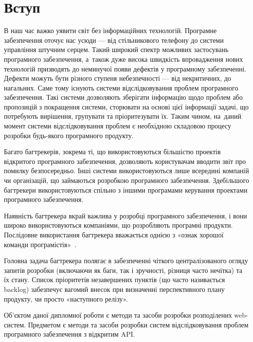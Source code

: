 \documentclass[../main.tex]{subfiles}
\begin{document}
\chapter*{Вступ}

В наш час важко уявити світ без інформаційних технологій. Програмне забезпечення оточує нас усюди — від стільникового телефону до системи управління штучним серцем. Такий широкий спектр можливих застосувань програмного забезпечення, а~також дуже висока швидкість впровадження нових технологій призводять до неминучої появи дефектів у програмному забезпеченні. Дефекти можуть бути різного ступеня небезпечності — від некритичних, до нагальних. Саме тому існують системи відслідковування проблем програмного забезпечення. Такі системи дозволяють зберігати інформацію щодо проблем або пропозицій з покращення системи, сторювати на основі цієї інформації задачі, що потребують вирішення, групувати та пріоритезувати їх. Таким чином, на~даний момент системи відслідковування проблем є необхідною складовою процесу розробки будь-якого програмного продукту.

Багато багтрекерів, зокрема ті, що використовуються більшістю проектів відкритого програмного забезпечення, дозволяють користувачам вводити звіт про помилку безпосередньо. Інші системи використовуються лише всередині компаній чи організацій, що займаються розробкою програмного забезпечення. Здебільшого багтрекери використовуються спільно з іншими програмами керування проектами програмного забезпечення.

Наявність багтрекера вкрай важлива у розробці програмного забезпечення, і вони широко використовуються компаніями, що розробляють програмні продукти. Послідовне використання багтрекера вважається однією з «ознак хорошої команди програмістів»~\cite{painless_bug_tracking}.

Головна задача багтрекера полягає в забезпеченні чіткого централізованого огляду запитів розробки (включаючи як баги, так і зручності, різниця часто нечітка) та їх стану. Список пріоритетів незавершених пунктів (що часто називається backlog) забезпечує вагомий внесок при визначенні перспективного плану продукту, чи просто «наступного релізу».

Об'єктом даної дипломної роботи є методи та засоби розробки розподілених web-систем. Предметом є методи та засоби розробки систем відслідковування проблем програмного забезпечення з відкритим API.
\end{document}
